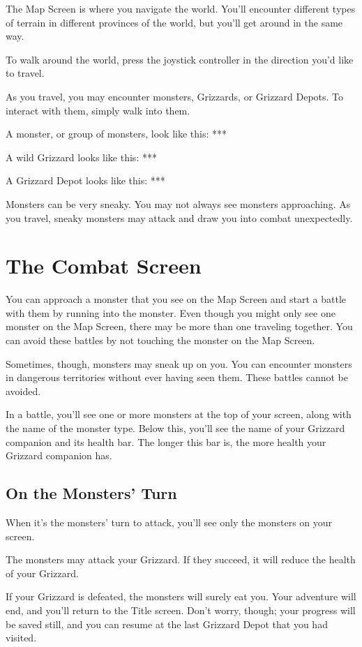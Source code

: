 \documentclass[12pt,twoside]{memoir}
\begin{document}
The Map Screen is where you navigate the world.  You'll encounter different
types of terrain in different provinces of the world, but you'll get around
in the same way.

To walk around the world, press the joystick controller in the direction
you'd like to travel.

As you travel, you may encounter monsters, Grizzards, or Grizzard Depots. To
interact with them, simply walk into them.

A monster, or group of monsters, look like this: ***

A wild Grizzard looks like this: ***

A Grizzard Depot looks like this: ***

Monsters   can    be   very   sneaky.    You   may   not    always   see
monsters approaching. As you travel, sneaky monsters may attack and draw
you into combat unexpectedly.

\section{The Combat Screen}

You can approach a monster that you see on the Map Screen and start a
battle with them by running into the monster. Even though you might
only see one monster on the Map Screen, there may be more than one
traveling together. You can avoid these battles by not touching the
monster on the Map Screen.

Sometimes,  though, monsters  may sneak  up  on you.  You can  encounter
monsters  in  dangerous  territories  without  ever  having  seen  them.
These battles cannot be avoided.

In a battle, you'll see one or  more monsters at the top of your screen,
along with the name of the monster type. Below this, you'll see the name
of your Grizzard  companion and its health bar. The  longer this bar is,
the more health your Grizzard companion has.

\subsection{On the Monsters' Turn}

When it's the monsters' turn to attack, you'll see only the monsters
on your screen.

The monsters may  attack your Grizzard. If they succeed,  it will reduce
the health of your Grizzard.

If  your  Grizzard  is  defeated,  the monsters  will  surely  eat  you.
Your  adventure  will  end,  and  you'll return  to  the  Title  screen.
Don't worry,  though; your  progress will  be saved  still, and  you can
resume at the last Grizzard Depot that you had visited.
\end{document}
